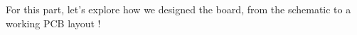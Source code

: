 For this part, let's explore how we designed the board, from the schematic
to a working PCB layout !



% 

